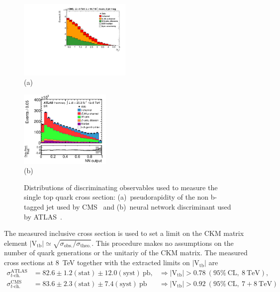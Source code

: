 \documentclass{PoS}
\begin{document}
\begin{figure}[htbp]
\begin{center}
\parbox[t]{0.5\textwidth}{\centering\includegraphics[width=0.48\textwidth]{cms_xsec8/etamuon.pdf}\\(a)}
\parbox[t]{0.42\textwidth}{\centering\includegraphics[width=0.39\textwidth]{atlas_xsec8/nnoutput.pdf}\\(b)}

\end{center}
\caption{\label{fig:fit-xsec-8}Distributions of discriminating observables used to measure the single top quark cross section: (a)~pseudorapidity of the non b-tagged jet used by CMS~\cite{cms-xsec8} and (b)~neural network discriminant used by ATLAS~\cite{atlas-xsec8}.}

\end{figure}

The measured inclusive cross section is used to set a limit on the CKM matrix element $|\mathrm{V_{tb}}|\simeq\sqrt{\sigma_\mathrm{obs.}/\sigma_\mathrm{theo.}}$. This procedure makes no assumptions on the number of quark generations or the unitariy of the CKM matrix. The measured cross sections at 8~TeV together with the extracted limits on $\mathrm{|V_{tb}|}$ are 
\begin{align}
\sigma_{t\mbox{-}\mathrm{ch.}}^\mathrm{ATLAS}&=82.6\pm1.2\mathrm{(stat)}\pm12.0\mathrm{(syst)}~\mathrm{pb}, &\Rightarrow |\mathrm{V_{tb}}|>0.78~\mathrm{(95\%~CL,~8~TeV)}, \\
\sigma_{t\mbox{-}\mathrm{ch.}}^\mathrm{CMS}&=83.6\pm2.3\mathrm{(stat)}\pm7.4\mathrm{(syst)}~\mathrm{pb} &\Rightarrow |\mathrm{V_{tb}}|>0.92~\mathrm{(95\%~CL,~7+8~TeV)}
\end{align}
\end{document}
